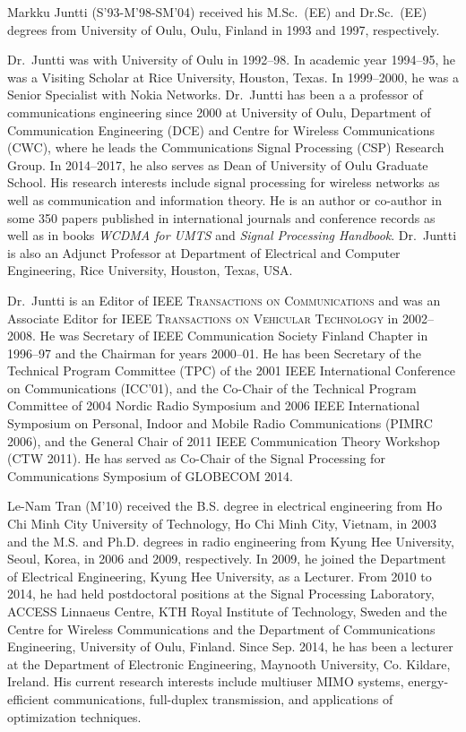 \begin{IEEEbiography}{Markku Juntti}
(S'93-M'98-SM'04) received his M.Sc.\ (EE) and Dr.Sc.\ (EE) degrees from University of Oulu, Oulu, Finland in 1993 and 1997, respectively.
	
Dr.\ Juntti was with University of Oulu in 1992--98. In academic year 1994--95, he was a Visiting Scholar at Rice University, Houston, Texas. In 1999--2000, he was a Senior Specialist with Nokia Networks. Dr.\ Juntti has been a a professor of communications engineering since 2000 at University of Oulu, Department of Communication Engineering (DCE) and Centre for Wireless Communications (CWC), where he leads the Communications Signal Processing (CSP) Research Group. In 2014--2017, he also serves as Dean of University of Oulu Graduate School. His research interests include signal processing for wireless networks as well as communication and information theory. He is an author or co-author in some 350 papers published in international journals and conference records as well as in books {\it WCDMA for UMTS} and {\it Signal Processing Handbook}. Dr.\ Juntti is also an Adjunct Professor at Department of Electrical and Computer Engineering, Rice University, Houston, Texas, USA.
	
Dr.\ Juntti is an Editor of \textsc{IEEE Transactions on Communications} and was an Associate Editor for \textsc{IEEE Transactions on Vehicular Technology} in 2002--2008. He was Secretary of IEEE Communication Society Finland Chapter in 1996--97 and the Chairman for years 2000--01. He has been Secretary of the Technical Program Committee (TPC) of the 2001 IEEE International Conference on Communications (ICC'01), and the Co-Chair of the Technical Program Committee of 2004 Nordic Radio Symposium and 2006 IEEE International Symposium on Personal, Indoor and Mobile Radio Communications (PIMRC 2006), and the General Chair of 2011 IEEE Communication Theory Workshop (CTW 2011). He has served as Co-Chair of the Signal Processing for Communications Symposium of GLOBECOM 2014.
\end{IEEEbiography}

\begin{IEEEbiography}{Le-Nam Tran}
	(M'10) received the B.S. degree in electrical engineering from Ho Chi Minh City University of Technology, Ho Chi Minh City, Vietnam, in 2003 and the M.S. and Ph.D. degrees in radio engineering from Kyung Hee University, Seoul, Korea, in 2006 and 2009, respectively. In 2009, he joined the Department of Electrical Engineering, Kyung Hee University, as a Lecturer. From 2010 to 2014, he had held postdoctoral positions at the Signal Processing Laboratory, ACCESS Linnaeus Centre, KTH Royal Institute of Technology, Sweden and the Centre for Wireless Communications and the Department of Communications Engineering, University of Oulu, Finland. Since Sep. 2014, he has been a lecturer at the Department of Electronic Engineering, Maynooth University, Co. Kildare, Ireland. His current research interests include multiuser MIMO systems, energy-efficient communications, full-duplex transmission, and applications of optimization techniques.
\end{IEEEbiography}
